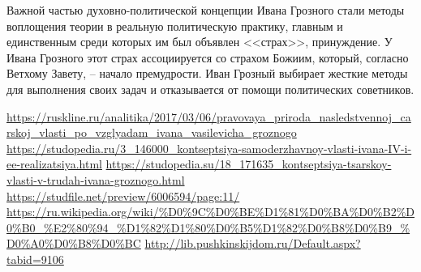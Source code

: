 \documentclass[12pt]{article}
\begin{document}
  Важной частью духовно-политической концепции Ивана Грозного стали методы воплощения теории в реальную политическую практику,
  главным и единственным среди которых им был объявлен <<страх>>, принуждение.
  У  Ивана Грозного этот страх ассоциируется со страхом Божиим, который, согласно Ветхому Завету, -- начало премудрости.
  Иван Грозный выбирает жесткие методы для выполнения своих задач и отказывается от помощи политических советников.


  \begin{thebibliography}{9}
     \url{https://ruskline.ru/analitika/2017/03/06/pravovaya_priroda_nasledstvennoj_carskoj_vlasti_po_vzglyadam_ivana_vasilevicha_groznogo}
     \url{https://studopedia.ru/3_146000_kontseptsiya-samoderzhavnoy-vlasti-ivana-IV-i-ee-realizatsiya.html}
     \url{https://studopedia.su/18_171635_kontseptsiya-tsarskoy-vlasti-v-trudah-ivana-groznogo.html}
     \url{https://studfile.net/preview/6006594/page:11/}
     \url{https://ru.wikipedia.org/wiki/%D0%9C%D0%BE%D1%81%D0%BA%D0%B2%D0%B0_%E2%80%94_%D1%82%D1%80%D0%B5%D1%82%D0%B8%D0%B9_%D0%A0%D0%B8%D0%BC}
     \url{http://lib.pushkinskijdom.ru/Default.aspx?tabid=9106}
  \end{thebibliography}
\end{document}
